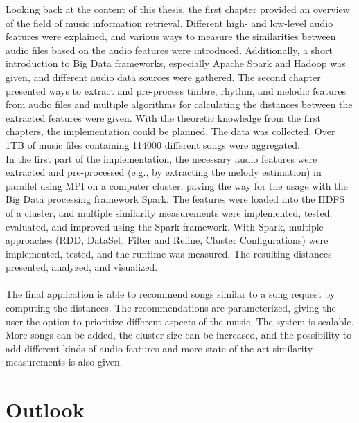 Looking back at the content of this thesis, the first chapter provided an overview of the field of music information retrieval. Different high- and low-level audio features were explained, and various ways to measure the similarities between audio files based on the audio features were introduced. Additionally, a short introduction to Big Data frameworks, especially Apache Spark and Hadoop was given, and different audio data sources were gathered. The second chapter presented ways to extract and pre-process timbre, rhythm, and melodic features from audio files and multiple algorithms for calculating the distances between the extracted features were given. With the theoretic knowledge from the first chapters, the implementation could be planned. The data was collected. Over 1TB of music files containing 114000 different songs were aggregated.\\ 
In the first part of the implementation, the necessary audio features were extracted and pre-processed (e.g., by extracting the melody estimation) in parallel using MPI on a computer cluster, paving the way for the usage with the Big Data processing framework Spark.
The features were loaded into the HDFS of a cluster, and multiple similarity measurements were implemented, tested, evaluated, and improved using the Spark framework. With Spark, multiple approaches (RDD, DataSet, Filter and Refine, Cluster Configurations) were implemented, tested, and the runtime was measured. The resulting distances presented, analyzed, and visualized.\\
\ \\
The final application is able to recommend songs similar to a song request by computing the distances. The recommendations are parameterized, giving the user the option to prioritize different aspects of the music. The system is scalable. More songs can be added, the cluster size can be increased, and the possibility to add different kinds of audio features and more state-of-the-art similarity measurements is also given. 

\section{Outlook}


